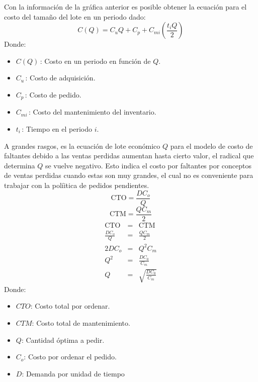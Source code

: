 \documentclass[letterpaper, 12pt]{article}
\begin{document}
    \justify
    Con la información de la gráfica anterior es posible obtener la ecuación para el costo del tamaño del lote en un periodo dado:
    \[C(Q)=C_uQ+C_p+C_{mi}\left(\frac{t_iQ}{2}\right)\]
    \justify
    Donde:
    \begin{itemize}
        \item \(C(Q)\,\): Costo en un periodo en función de \(Q\).
        \item \(C_u\,\): Costo de adquisición.
        \item \(C_p\,\): Costo de pedido.
        \item \(C_{mi}\,\): Costo del mantenimiento del inventario.
        \item \(t_i\,\): Tiempo en el periodo \(i\).
    \end{itemize}
    A grandes rasgos, es la ecuación de lote económico \(Q\) para el modelo de costo de faltantes debido a las ventas perdidas aumentan hasta cierto valor, el radical que determina \(Q\) se vuelve negativo.
    Esto indica el costo por faltantes por conceptos de ventas perdidas cuando estas son muy grandes, el cual no es conveniente para trabajar con la políitica de pedidos pendientes.
    \\\newline
    \[\text{CTO}=\frac{DC_o}{Q}\]
    \[\text{CTM}=\frac{QC_m}{2}\]
    \[\begin{matrix}
        \text{CTO}&=&\text{CTM}\\
        \frac{DC_o}{Q}&=&\frac{QC_m}{2}\\
        2DC_o&=&Q^2C_m\\
        Q^2&=&\frac{DC_0}{C_m}\\
        Q&=&\sqrt{\frac{DC_0}{C_m}}
    \end{matrix}\]
    Donde:
    \begin{itemize}
        \item \(CTO\): Costo total por ordenar.
        \item \(CTM\): Costo total de mantenimiento.
        \item \(Q\): Cantidad óptima a pedir.
        \item \(C_o\): Costo por ordenar el pedido.
        \item \(D\): Demanda por unidad de tiempo
    \end{itemize}
\end{document}
